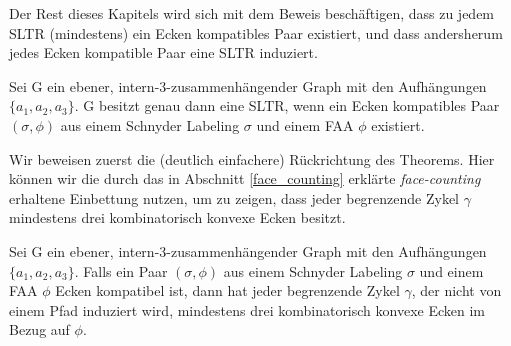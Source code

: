 Der Rest dieses Kapitels wird sich mit dem Beweis beschäftigen, dass zu jedem SLTR (mindestens) ein Ecken kompatibles Paar existiert, und dass andersherum jedes Ecken kompatible Paar eine SLTR induziert. 

\begin{theorem}\label{theo_ccc}
Sei G ein ebener, intern-3-zusammenhängender Graph mit den Aufhängungen $\{a_1,a_2,a_3\}$. G besitzt genau dann eine SLTR, wenn ein Ecken kompatibles Paar $(\sigma,\phi)$ aus einem Schnyder Labeling $\sigma$ und einem FAA $\phi$ existiert.
\end{theorem}

Wir beweisen zuerst die (deutlich einfachere) Rückrichtung des Theorems. Hier können wir die durch das in Abschnitt \ref{face_counting} erklärte \textit{face-counting} erhaltene Einbettung nutzen, um zu zeigen, dass jeder begrenzende Zykel $\gamma$ mindestens drei kombinatorisch konvexe Ecken besitzt. 

\begin{lemma}\label{lem1}
Sei G ein ebener, intern-3-zusammenhängender Graph mit den Aufhängungen $\{a_1,a_2,a_3\}$. Falls ein Paar $(\sigma,\phi)$ aus einem Schnyder Labeling $\sigma$ und einem FAA $\phi$ Ecken kompatibel ist, dann hat jeder begrenzende Zykel $\gamma$, der nicht von einem Pfad induziert wird, mindestens drei kombinatorisch konvexe Ecken im Bezug auf $\phi$.
\end{lemma}

